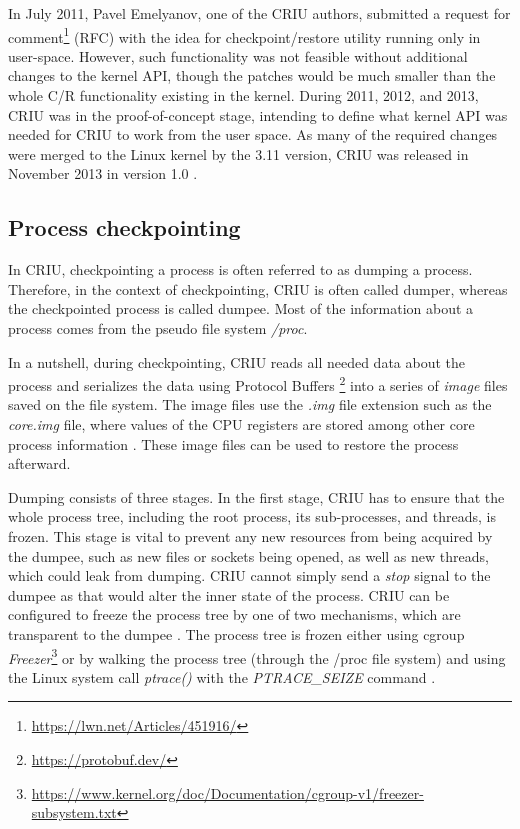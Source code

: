 \documentclass[
  digital,     %
  oneside,     %
  nosansbold,  %
  nocolorbold, %
  lof,         %
  lot,         %
]{fithesis4}
\begin{document}
In July 2011, Pavel Emelyanov, one of the CRIU authors, submitted a request for comment\footnote{\url{https://lwn.net/Articles/451916/}} (RFC) with the idea for checkpoint/restore utility running only in user-space. However, such functionality was not feasible without additional changes to the kernel API, though the patches would be much smaller than the whole C/R functionality existing in the kernel. During 2011, 2012, and 2013, CRIU was in the proof-of-concept stage, intending to define what kernel API was needed for CRIU to work from the user space. As many of the required changes were merged to the Linux kernel by the 3.11 version, CRIU was released in November 2013 in version 1.0 \cite{criu_history}. 


\subsection{Process checkpointing}
In CRIU, checkpointing a process is often referred to as dumping a process. Therefore, in the context of checkpointing, CRIU is often called dumper, whereas the checkpointed process is called dumpee. Most of the information about a process comes from the pseudo file system \emph{/proc}. 

In a nutshell, during checkpointing, CRIU reads all needed data about the process and serializes the data using Protocol Buffers \footnote{\url{https://protobuf.dev/}} into a series of \emph{image} files saved on the file system. The image files use the \emph{.img} file extension such as the \emph{core.img} file, where values of the CPU registers are stored among other core process information \cite{criu_images}. These image files can be used to restore the process afterward. 

Dumping consists of three stages. In the first stage, CRIU has to ensure that the whole process tree, including the root process, its sub-processes, and threads, is frozen. This stage is vital to prevent any new resources from being acquired by the dumpee, such as new files or sockets being opened, as well as new threads, which could leak from dumping. CRIU cannot simply send a \emph{stop} signal to the dumpee as that would alter the inner state of the process. CRIU can be configured to freeze the process tree by one of two mechanisms, which are transparent to the dumpee \cite{criu_freezing}. The process tree is frozen either using cgroup \emph{Freezer}\footnote{\url{https://www.kernel.org/doc/Documentation/cgroup-v1/freezer-subsystem.txt}} or by walking the process tree (through the /proc file system) and using the Linux system call \emph{ptrace()} with the \emph{PTRACE\_SEIZE} command \cite{criu_cr}.
\end{document}
